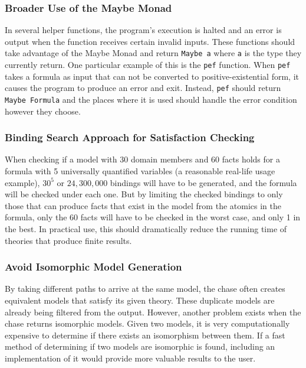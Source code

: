 		\subsubsection{Broader Use of the Maybe Monad}

			In several helper functions, the program's execution is halted and
			an error is output when the function receives certain invalid
			inputs. These functions should take advantage of the Maybe Monad
			and return {\tt Maybe a} where {\tt a} is the type they currently
			return. One particular example of this is the {\tt pef} function.
			When {\tt pef} takes a formula as input that can not be converted
			to positive-existential form, it causes the program to produce an
			error and exit. Instead, {\tt pef} should return {\tt Maybe
			Formula} and the places where it is used should handle the error
			condition however they choose.

		\subsubsection{Binding Search Approach for Satisfaction Checking}

			When checking if a model with 30 domain members and 60 facts holds
			for a formula with 5 universally quantified variables (a reasonable
			real-life usage example), $30^5$ or $24,300,000$ bindings will have
			to be generated, and the formula will be checked under each one.
			But by limiting the checked bindings to only those that can produce
			facts that exist in the model from the atomics in the formula, only
			the 60 facts will have to be checked in the worst case, and only 1
			in the best. In practical use, this should dramatically reduce the
			running time of theories that produce finite results.

		\subsubsection{Avoid Isomorphic Model Generation}

			By taking different paths to arrive at the same model, the chase
			often creates equivalent models that satisfy its given theory.
			These duplicate models are already being filtered from the output.
			However, another problem exists when the chase returns isomorphic
			models. Given two models, it is very computationally expensive to
			determine if there exists an isomorphism between them. If a fast
			method of determining if two models are isomorphic is found,
			including an implementation of it would provide more valuable
			results to the user.


